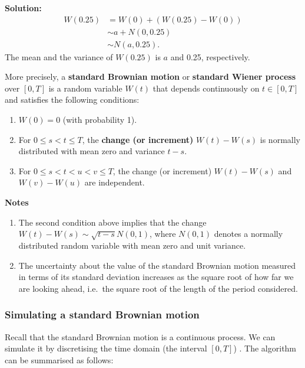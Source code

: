 \documentclass[
]{book}
\theoremstyle{definition}
\theoremstyle{definition}
\theoremstyle{definition}
\theoremstyle{definition}
\theoremstyle{remark}
\begin{document}
\textbf{Solution:} \[\begin{aligned}
    W(0.25) &= W(0) + (W(0.25) - W(0)) \\
            & \sim a + N(0,0.25)  \\
            & \sim N(a, 0.25).\end{aligned}\] The mean and the variance
of \(W(0.25)\) is \(a\) and 0.25, respectively.

More precisely, a \textbf{standard Brownian motion} or \textbf{standard Wiener
process} over \([0,T]\) is a random variable \(W(t)\) that depends
continuously on \(t \in [0,T]\) and satisfies the following conditions:

\begin{enumerate}
\def\labelenumi{\arabic{enumi}.}
\item
  \(W(0) = 0\) (with probability 1).
\item
  For \(0 \le s < t \le T\), the \textbf{change (or increment)} \(W(t) - W(s)\)
  is normally distributed with mean zero and variance \(t -s\).
\item
  For \(0 \le s < t < u < v \le T\), the change (or increment)
  \(W(t) - W(s)\) and \(W(v) - W(u)\) are independent.
\end{enumerate}

\textbf{Notes}

\begin{enumerate}
\def\labelenumi{\arabic{enumi}.}
\item
  The second condition above implies that the change
  \(W(t) - W(s) \sim \sqrt{t-s} N(0,1)\), where \(N(0,1)\) denotes a
  normally distributed random variable with mean zero and unit
  variance.
\item
  The uncertainty about the value of the standard Brownian motion
  measured in terms of its standard deviation increases as the square
  root of how far we are looking ahead, i.e.~the square root of the
  length of the period considered.
\end{enumerate}

\hypertarget{simulating-a-standard-brownian-motion}{%
\subsubsection{Simulating a standard Brownian motion}\label{simulating-a-standard-brownian-motion}}

Recall that the standard Brownian motion is a continuous process. We can
simulate it by discretising the time domain (the interval \([0,T]\)) . The
algorithm can be summarised as follows:
\end{document}
